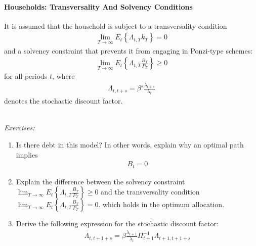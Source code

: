 \paragraph{Households: Transversality And Solvency Conditions}
It is assumed that the household is subject to a transversality condition
\begin{align*}
	\lim_{T \rightarrow \infty} E_t \left\{\Lambda_{t,T} k_T\right\} = 0
\end{align*}
and a solvency constraint that prevents it from engaging in Ponzi-type schemes:
\begin{align*}
	\lim_{T \rightarrow \infty} E_t \left\{\Lambda_{t,T} \frac{B_T}{P_T}\right\} \geq 0
\end{align*}
for all periods $t$, where
\begin{align}
\Lambda_{t,t+s} = \beta^{s} \frac{\lambda_{t+s}}{\lambda_t} \label{eq:NewKeynesian.StochasticDiscountFactor}
\end{align}
denotes the stochastic discount factor.

~\\\noindent\emph{Exercises:}
\begin{enumerate}[resume]

\item Is there debt in this model? In other words, explain why an optimal path implies
\begin{align}
B_t = 0 \label{eq:NewKeynesian.MarketClearing.Bonds}
\end{align}

\item Explain the difference between the solvency constraint
  $\lim_{T \rightarrow \infty} E_t \left\{\Lambda_{t,T} \frac{B_T}{P_T}\right\} \geq 0$
  and the transversality condition
  $\lim_{T \rightarrow \infty} E_t \left\{\Lambda_{t,T} \frac{B_T}{P_T}\right\} = 0$.
  which holds in the optimum allocation.

\item Derive the following expression for the stochastic discount factor:
\begin{align}
\Lambda_{t,t+1+s} = \beta \frac{\lambda_{t+1}}{\lambda_t} \Pi_{t+1}^{-1} \Lambda_{t+1,t+1+s} \label{eq:NewKeynesian.StochasticDiscountFactorRecursive}
\end{align}

\end{enumerate}

